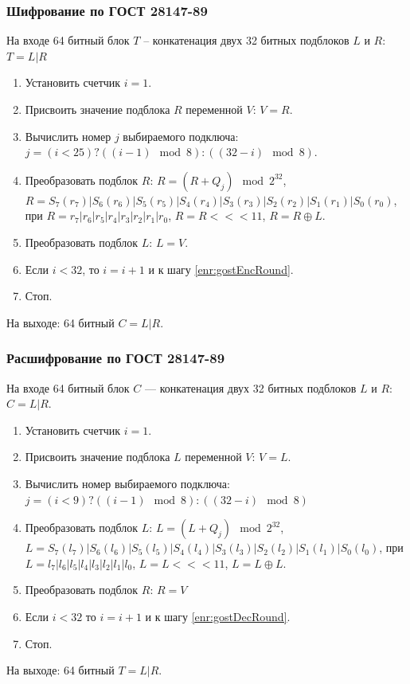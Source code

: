 \begin{frame}
    \frametitle{Шифрование по ГОСТ 28147-89}
    
    На входе 64 битный блок $T$ – конкатенация двух 32 битных подблоков $L$ и $R$: $T=L|R$
    \begin{enumerate}
        \item Установить счетчик $i=1$.
        \item \label{enr:gostEncRound} Присвоить значение подблока $R$ переменной $V$: $V=R$.
        \item Вычислить номер $j$ выбираемого подключа: $j = (i<25) ? ((i-1) \mod 8) : ((32-i) \mod 8)$.
        \item Преобразовать подблок $R$: 
            $R=(R+Q_j) \mod 2^{32}$,
            $R=S_7(r_7)|S_6(r_6)|S_5(r_5)|S_4(r_4)|S_3(r_3)|S_2(r_2)|S_1(r_1)|S_0(r_0)$, при 
            $R= r_7|r_6|r_5|r_4|r_3|r_2|r_1|r_0$,
            $R=R<<<11$,
            $R=R \oplus L$.
        \item Преобразовать подблок $L$: $L=V$.
        \item Если $i<32$, то $i=i+1$ и к шагу \ref{enr:gostEncRound}.
        \item Стоп.
    \end{enumerate}
    На выходе: 64 битный $C=L|R$.
\end{frame}


\begin{frame}
    \frametitle{Расшифрование по ГОСТ 28147-89}

    На входе 64 битный блок $C$ --- конкатенация двух 32 битных подблоков $L$ и $R$: $C=L|R$.
    \begin{enumerate}
        \item Установить счетчик $i=1$.
        \item \label{enr:gostDecRound} Присвоить значение подблока $L$ переменной $V$: $V=L$.
        \item Вычислить номер выбираемого подключа: 
            $j = (i<9) ? ((i-1) \mod 8) : ((32-i) \mod 8)$
        \item Преобразовать подблок $L$: 
            $L=(L+Q_j) \mod 2^{32}$,
            $L=S_7(l_7)|S_6(l_6)|S_5(l_5)|S_4(l_4)|S_3(l_3)|S_2(l_2)|S_1(l_1)|S_0(l_0)$, при 
            $L=l_7|l_6|l_5|l_4|l_3|l_2|l_1|l_0$,
            $L=L<<<11$,
            $L=L \oplus L$.
        \item Преобразовать подблок $R$: $R=V$
        \item Если $i<32$ то $i=i+1$ и к шагу \ref{enr:gostDecRound}.
        \item Стоп.
    \end{enumerate}
    На выходе: 64 битный $T=L|R$.
\end{frame}


